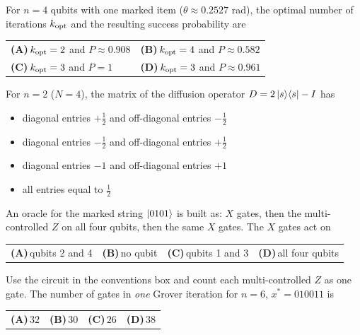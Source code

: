 \documentclass[11pt,a4paper]{article}
\newcommand{\optlabel}[1]{\textbf{(#1)}}
\newenvironment{qitem}[1]{\begin{list}{}{\setlength{\leftmargin}{3.3em}\setlength{\labelwidth}{3.1em}%
  \setlength{\labelsep}{0.2em}\setlength{\topsep}{3pt}\setlength{\parsep}{3pt}}\item[\textbf{Q.#1}\hfill]}{\end{list}}
\newcommand{\qsep}{\par\vspace{2pt}{\color{black!15}\hrule}\vspace{4pt}}
\begin{document}
\begin{qitem}{43}
For $n = 4$ qubits with one marked item ($\theta \approx 0.2527$ rad), the optimal number of iterations $k_{\rm opt}$ and the resulting success probability are
\par\smallskip\noindent\begin{tabularx}{\linewidth}{@{}*{2}{L}@{}}
\optlabel{A}\,$k_{\rm opt} = 2$ and $P \approx 0.908$ & \optlabel{B}\,$k_{\rm opt} = 4$ and $P \approx 0.582$ \\[3pt]
\optlabel{C}\,$k_{\rm opt} = 3$ and $P = 1$ & \optlabel{D}\,$k_{\rm opt} = 3$ and $P \approx 0.961$
\end{tabularx}
\end{qitem}
\qsep

\begin{qitem}{44}
For $n = 2$ ($N = 4$), the matrix of the diffusion operator $D = 2\ket{s}\!\bra{s} - I$ has
\begin{itemize}[leftmargin=2.6em, labelsep=0.4em, itemsep=2pt, topsep=3pt]
\item[\optlabel{A}] diagonal entries $+\frac12$ and off-diagonal entries $-\frac12$
\item[\optlabel{B}] diagonal entries $-\frac12$ and off-diagonal entries $+\frac12$
\item[\optlabel{C}] diagonal entries $-1$ and off-diagonal entries $+1$
\item[\optlabel{D}] all entries equal to $\frac12$
\end{itemize}
\end{qitem}
\qsep

\begin{qitem}{45}
An oracle for the marked string $\ket{0101}$ is built as: $X$ gates, then the multi-controlled $Z$ on all four qubits, then the same $X$ gates. The $X$ gates act on
\par\smallskip\noindent\begin{tabularx}{\linewidth}{@{}*{4}{L}@{}}
\optlabel{A}\,qubits 2 and 4 & \optlabel{B}\,no qubit & \optlabel{C}\,qubits 1 and 3 & \optlabel{D}\,all four qubits
\end{tabularx}
\end{qitem}
\qsep

\begin{qitem}{46}
Use the circuit in the conventions box and count each multi-controlled $Z$ as one gate. The number of gates in \emph{one} Grover iteration for $n = 6$, $x^\ast = 010011$ is
\par\smallskip\noindent\begin{tabularx}{\linewidth}{@{}*{4}{L}@{}}
\optlabel{A}\,$32$ & \optlabel{B}\,$30$ & \optlabel{C}\,$26$ & \optlabel{D}\,$38$
\end{tabularx}
\end{qitem}
\qsep
\end{document}
